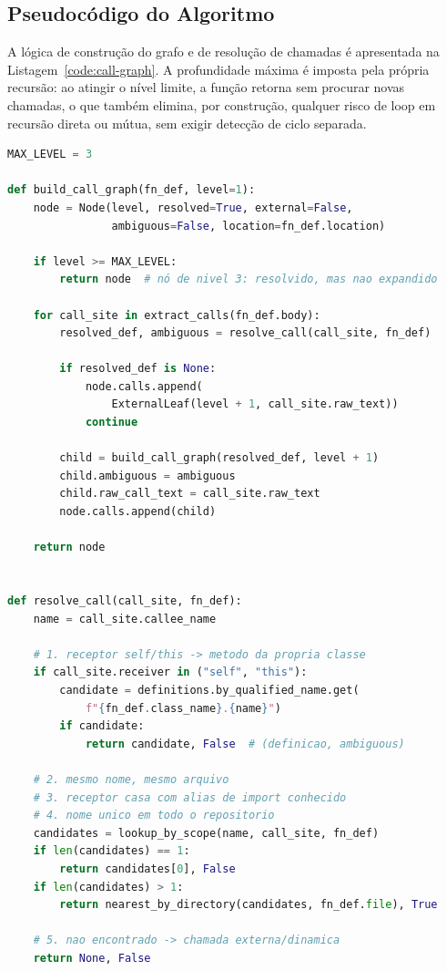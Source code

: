 \subsection*{Pseudocódigo do Algoritmo}
A lógica de construção do grafo e de resolução de chamadas é apresentada na
Listagem~\ref{code:call-graph}. A profundidade máxima é imposta pela
própria recursão: ao atingir o nível limite, a função retorna sem procurar
novas chamadas, o que também elimina, por construção, qualquer risco de
loop em recursão direta ou mútua, sem exigir detecção de ciclo separada.

\begin{lstlisting}[language=Python, caption=Construção do grafo de chamadas e resolução por nome, label=code:call-graph]
MAX_LEVEL = 3

def build_call_graph(fn_def, level=1):
    node = Node(level, resolved=True, external=False,
                ambiguous=False, location=fn_def.location)

    if level >= MAX_LEVEL:
        return node  # nó de nivel 3: resolvido, mas nao expandido

    for call_site in extract_calls(fn_def.body):
        resolved_def, ambiguous = resolve_call(call_site, fn_def)

        if resolved_def is None:
            node.calls.append(
                ExternalLeaf(level + 1, call_site.raw_text))
            continue

        child = build_call_graph(resolved_def, level + 1)
        child.ambiguous = ambiguous
        child.raw_call_text = call_site.raw_text
        node.calls.append(child)

    return node


def resolve_call(call_site, fn_def):
    name = call_site.callee_name

    # 1. receptor self/this -> metodo da propria classe
    if call_site.receiver in ("self", "this"):
        candidate = definitions.by_qualified_name.get(
            f"{fn_def.class_name}.{name}")
        if candidate:
            return candidate, False  # (definicao, ambiguous)

    # 2. mesmo nome, mesmo arquivo
    # 3. receptor casa com alias de import conhecido
    # 4. nome unico em todo o repositorio
    candidates = lookup_by_scope(name, call_site, fn_def)
    if len(candidates) == 1:
        return candidates[0], False
    if len(candidates) > 1:
        return nearest_by_directory(candidates, fn_def.file), True

    # 5. nao encontrado -> chamada externa/dinamica
    return None, False
\end{lstlisting}


